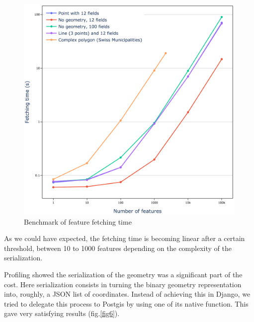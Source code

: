 \documentclass[runningheads]{llncs}
\begin{document}
\begin{figure}
	\includegraphics[width=\textwidth]{benchmarcka.png}
	\caption{Benchmark of feature fetching time} \label{fig5}
\end{figure}

As we could have expected, the fetching time is becoming linear after a certain threshold, between 10 to 1000 features depending on the complexity of the serialization.

Profiling showed the serialization of the geometry was a significant part of the cost. Here serialization consists in turning the binary geometry representation into, roughly, a JSON list of coordinates. Instead of achieving this in Django, we tried to delegate this process to Postgis by using one of its native function. This gave very satisfying results (fig.\ref{fig6}).
\end{document}
